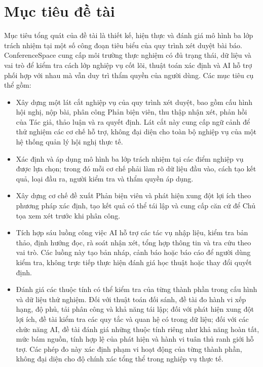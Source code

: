 \section{Mục tiêu đề tài}

Mục tiêu tổng quát của đề tài là thiết kế, hiện thực và đánh giá mô hình ba lớp trách nhiệm tại một số công đoạn tiêu biểu của quy trình xét duyệt bài báo. ConferenceSpace cung cấp môi trường thực nghiệm có đủ trạng thái, dữ liệu và vai trò để kiểm tra cách lớp nghiệp vụ cốt lõi, thuật toán xác định và AI hỗ trợ phối hợp với nhau mà vẫn duy trì thẩm quyền của người dùng. Các mục tiêu cụ thể gồm:

\begin{itemize}
\item Xây dựng một lát cắt nghiệp vụ của quy trình xét duyệt, bao gồm cấu hình hội nghị, nộp bài, phân công Phản biện viên, thu thập nhận xét, phản hồi của Tác giả, thảo luận và ra quyết định. Lát cắt này cung cấp ngữ cảnh để thử nghiệm các cơ chế hỗ trợ, không đại diện cho toàn bộ nghiệp vụ của một hệ thống quản lý hội nghị thực tế.
\item Xác định và áp dụng mô hình ba lớp trách nhiệm tại các điểm nghiệp vụ được lựa chọn; trong đó mỗi cơ chế phải làm rõ dữ liệu đầu vào, cách tạo kết quả, loại đầu ra, người kiểm tra và thẩm quyền áp dụng.
\item Xây dựng cơ chế đề xuất Phản biện viên và phát hiện xung đột lợi ích theo phương pháp xác định, tạo kết quả có thể tái lập và cung cấp căn cứ để Chủ tọa xem xét trước khi phân công.
\item Tích hợp sáu luồng công việc AI hỗ trợ các tác vụ nhập liệu, kiểm tra bản thảo, định hướng đọc, rà soát nhận xét, tổng hợp thông tin và tra cứu theo vai trò. Các luồng này tạo bản nháp, cảnh báo hoặc báo cáo để người dùng kiểm tra, không trực tiếp thực hiện đánh giá học thuật hoặc thay đổi quyết định.
\item Đánh giá các thuộc tính có thể kiểm tra của từng thành phần trong cấu hình và dữ liệu thử nghiệm. Đối với thuật toán đối sánh, đề tài đo hành vi xếp hạng, độ phủ, tải phân công và khả năng tái lập; đối với phát hiện xung đột lợi ích, đề tài kiểm tra các quy tắc và quan hệ có trong dữ liệu; đối với các chức năng AI, đề tài đánh giá những thuộc tính riêng như khả năng hoàn tất, mức bám nguồn, tính hợp lệ của phát hiện và hành vi tuân thủ ranh giới hỗ trợ. Các phép đo này xác định phạm vi hoạt động của từng thành phần, không đại diện cho độ chính xác tổng thể trong nghiệp vụ thực tế.
\end{itemize}


